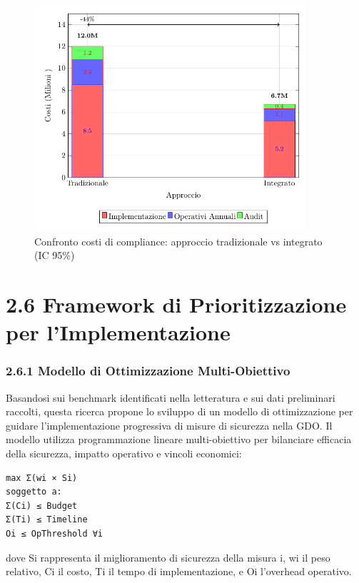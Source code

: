 \documentclass{report}
\begin{document}
\begin{figure}[htbp]
    \centering
    \includegraphics[width=0.9\textwidth]{figura 2-4}
    \caption{Confronto costi di compliance: approccio tradizionale vs integrato (IC 95\%)}
    \label{fig:confronto_costi}
\end{figure}

\section{2.6 Framework di Prioritizzazione per
l'Implementazione}\label{framework-di-prioritizzazione-per-limplementazione}

\subsubsection{2.6.1 Modello di Ottimizzazione
Multi-Obiettivo}\label{modello-di-ottimizzazione-multi-obiettivo}

Basandosi sui benchmark identificati nella letteratura e sui dati
preliminari raccolti, questa ricerca propone lo sviluppo di un modello
di ottimizzazione per guidare l'implementazione progressiva di misure di
sicurezza nella GDO. Il modello utilizza programmazione lineare
multi-obiettivo per bilanciare efficacia della sicurezza, impatto
operativo e vincoli economici:

\begin{verbatim}
max Σ(wi × Si)
soggetto a:
Σ(Ci) ≤ Budget
Σ(Ti) ≤ Timeline
Oi ≤ OpThreshold ∀i
\end{verbatim}

dove Si rappresenta il miglioramento di sicurezza della misura i, wi il
peso relativo, Ci il costo, Ti il tempo di implementazione, e Oi
l'overhead operativo.
\end{document}
